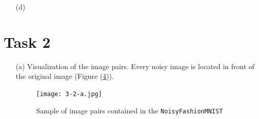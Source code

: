 \documentclass [a4paper, 11pt] {article}
\begin{document}
\begin{enumerate}
\begin{lstlisting}
ReLU-36            [-1, 512, 2, 2]               0
Conv2d-37            [-1, 512, 2, 2]       2,359,808
BatchNorm2d-38            [-1, 512, 2, 2]           1,024
ReLU-39            [-1, 512, 2, 2]               0
Conv2d-40           [-1, 1024, 1, 1]       4,719,616
BatchNorm2d-41           [-1, 1024, 1, 1]           2,048
ReLU-42           [-1, 1024, 1, 1]               0
Conv2d-43           [-1, 1024, 1, 1]       9,438,208
BatchNorm2d-44           [-1, 1024, 1, 1]           2,048
ReLU-45           [-1, 1024, 1, 1]               0
Conv2d-46           [-1, 1024, 1, 1]       9,438,208
BatchNorm2d-47           [-1, 1024, 1, 1]           2,048
ReLU-48           [-1, 1024, 1, 1]               0
Linear-49                   [-1, 10]          10,250
================================================================
Total params: 30,292,490
Trainable params: 30,292,490
Non-trainable params: 0
----------------------------------------------------------------
Input size (MB): 0.00
Forward/backward pass size (MB): 1.45
Params size (MB): 115.56
Estimated Total Size (MB): 117.01
----------------------------------------------------------------
\end{lstlisting}


\begin{figure}[!h]
	\centering
	\begin{subfigure}{0.7\textwidth}
		\centering
		\texttt{[image: 3-1-c-train.png]}
		\caption{Training accuracy curve}
		\label{fig:2a}
	\end{subfigure}
	\begin{subfigure}{0.7\textwidth}
		\centering
		\texttt{[image: 3-1-c-valid.png]}
		\caption{Validation accuracy curve}
		\label{fig:2b}
	\end{subfigure}
	\caption{Plot of results from task 3.1.c)}
	\label{fig:2}
\end{figure}

As we can see from the plots (Figure \ref{fig:2}) it seems that our network overfits the data and it could benefit from early stopping.


\item[(d)]

\end{enumerate}

\section*{Task 2}
\begin{enumerate}
	\item[(a)] Visualization of the image pairs. Every noisy image is located in front of the original image (Figure (\ref{fig:2-a})).
	
	\begin{figure}[!h]
		\centering
		\texttt{[image: 3-2-a.jpg]}
		\caption{Sample of image pairs contained in the \texttt{NoisyFashionMNIST}}
		\label{fig:2-a}
	\end{figure}
\end{enumerate}
	
\end{document}
